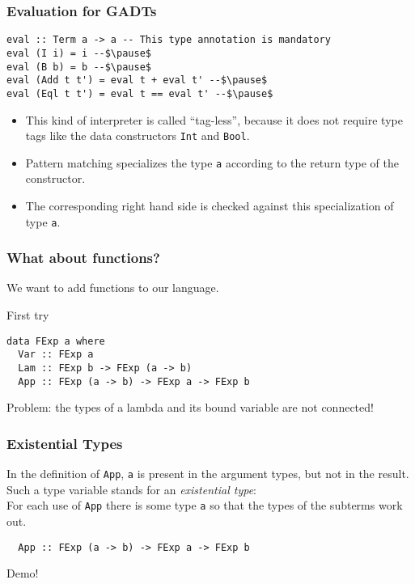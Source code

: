 \documentclass[pdftex,aspectratio=169]{beamer}
\begin{document}
\begin{frame}[fragile]
  \frametitle{Evaluation for GADTs}
  \begin{block}{}
    \begin{lstlisting}
eval :: Term a -> a -- This type annotation is mandatory
eval (I i) = i --$\pause$
eval (B b) = b --$\pause$
eval (Add t t') = eval t + eval t' --$\pause$
eval (Eql t t') = eval t == eval t' --$\pause$
    \end{lstlisting}
  \end{block}\pause
  \begin{itemize}[<+->]
  \item This kind of interpreter is called ``tag-less'', because it
    does not require type tags like the data constructors
    \lstinline{Int} and \lstinline{Bool}.
  \item Pattern matching specializes the type \lstinline{a} according
    to the return type of the constructor.
  \item The corresponding right hand side is checked against this
    specialization of type \lstinline{a}.
  \end{itemize}
\end{frame}

\begin{frame}[fragile]
  \frametitle{What about functions?}

  We want to add functions to our language.\pause

  \begin{block}{First try}
    \begin{lstlisting}
data FExp a where
  Var :: FExp a
  Lam :: FExp b -> FExp (a -> b)
  App :: FExp (a -> b) -> FExp a -> FExp b      
    \end{lstlisting}
  \end{block}\pause

  Problem: the types of a lambda and its bound variable are not connected!
\end{frame}

\begin{frame}[fragile]
  \frametitle{Existential Types}

  In the definition of \lstinline{App}, \lstinline{a} is present in
  the argument types, but not in the result. Such a type variable
  stands for an \emph{existential type}: \\
  For each use of \lstinline{App} there is some type \lstinline{a} so
  that the types of the subterms work out.
  \begin{block}{}
    \begin{lstlisting}
  App :: FExp (a -> b) -> FExp a -> FExp b      
    \end{lstlisting}
  \end{block}\pause
  Demo!
\end{frame}
\end{document}
